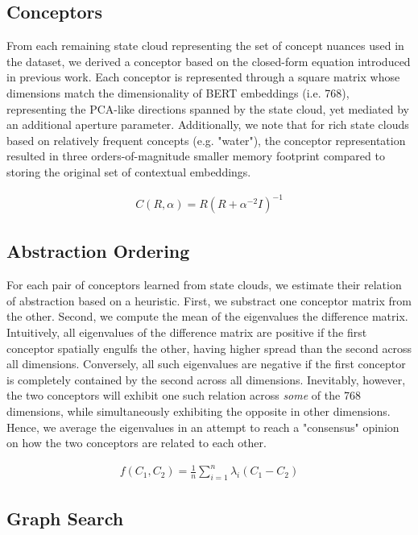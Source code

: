 \subsection{Conceptors}

From each remaining state cloud representing the set of concept nuances used in the dataset, we derived a conceptor based on the closed-form equation introduced in previous work. Each conceptor is represented through a square matrix whose dimensions match the dimensionality of BERT embeddings (i.e. 768), representing the PCA-like directions spanned by the state cloud, yet mediated by an additional aperture parameter. Additionally, we note that for rich state clouds based on relatively frequent concepts (e.g. "water"), the conceptor representation resulted in three orders-of-magnitude smaller memory footprint compared to storing the original set of contextual embeddings.

\begin{align*}
    C(R, \alpha) = R (R + \alpha^{-2} I)^{-1}
\end{align*}

\subsection{Abstraction Ordering}

For each pair of conceptors learned from state clouds, we estimate their relation of abstraction based on a heuristic. First, we substract one conceptor matrix from the other. Second, we compute the mean of the eigenvalues the difference matrix. Intuitively, all eigenvalues of the difference matrix are positive if the first conceptor spatially engulfs the other, having higher spread than the second across all dimensions. Conversely, all such eigenvalues are negative if the first conceptor is completely contained by the second across all dimensions. Inevitably, however, the two conceptors will exhibit one such relation across \textit{some} of the 768 dimensions, while simultaneously exhibiting the opposite in other dimensions. Hence, we average the eigenvalues in an attempt to reach a "consensus" opinion on how the two conceptors are related to each other.

\begin{align*}
    f(C_1, C_2) = \frac{1}{n} \sum\limits_{i=1}^n \lambda_i(C_1 - C_2)
\end{align*}

\subsection{Graph Search}

